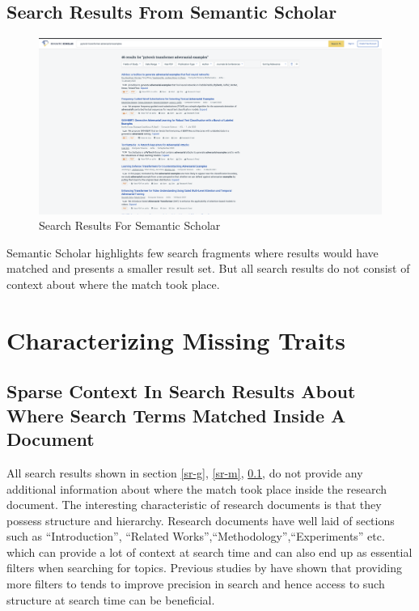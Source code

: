 \pagebreak
\subsection{Search Results From Semantic Scholar}
\label{sr-s}
\begin{figure}[h]
    \centering
    \includegraphics[width=\maxwidth{\textwidth}]{src/images/ss-example.png}
    \caption{Search Results For Semantic Scholar}
    \label{figure\arabic{figurecounter}}
\end{figure}
Semantic Scholar highlights few search fragments where results would have matched and presents a smaller result set. 
But all search results do not consist of context about where the match took place. 

\pagebreak
\section{Characterizing Missing Traits}
\label{section:intro:missing_traits}

\subsection{Sparse Context In Search Results About Where Search Terms Matched Inside A Document}

All search results shown in section \ref{sr-g}, \ref{sr-m}, \ref{sr-s}, do not provide any additional 
information about where the match took place inside the research document. The interesting characteristic of research documents is that they 
possess structure and hierarchy. Research documents have well laid of sections such as “Introduction”, “Related Works”,“Methodology”,“Experiments” etc. 
which can provide a lot of context at search time and can also end up as essential filters when searching for topics. 
Previous studies by \parencite{kacem2018analysis} have shown that providing more filters to tends to improve 
precision in search and hence access to such structure at search time can be beneficial. 
\pagebreak
